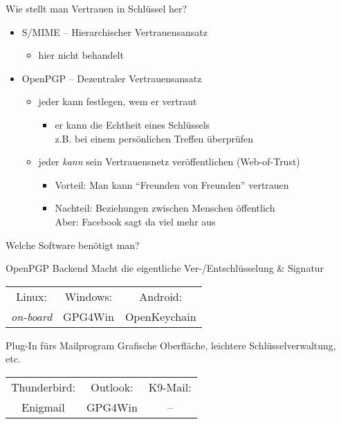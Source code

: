 \begin{frame}{Wie stellt man Vertrauen in Schlüssel her?}
  \begin{itemize}
    \item S/MIME -- Hierarchischer Vertrauensansatz
    \begin{itemize}
      \item hier nicht behandelt
    \end{itemize}
    \item OpenPGP -- Dezentraler Vertrauensansatz
    \begin{itemize}
      \item jeder kann festlegen, wem er vertraut
      \begin{itemize}
        \item er kann die Echtheit eines Schlüssels\\ z.B. bei einem persönlichen Treffen überprüfen
      \end{itemize}
      \item jeder \emph{kann} sein Vertrauensnetz veröffentlichen (Web-of-Trust)
      \begin{itemize}
        \item Vorteil: Man kann ``Freunden von Freunden'' vertrauen
        \item Nachteil: Beziehungen zwischen Menschen öffentlich\\ Aber: Facebook sagt da viel mehr aus
      \end{itemize}
    \end{itemize}
  \end{itemize}
\end{frame}

\begin{frame}{Welche Software benötigt man?}
  \begin{block}{OpenPGP Backend}
    Macht die eigentliche Ver-/Entschlüsselung \& Signatur

    \vspace{1ex}
    \begin{tabular}{ccc}
      Linux:            & Windows: & Android:     \\
      \textit{on-board} & GPG4Win  & OpenKeychain \\
    \end{tabular}
  \end{block}
  \begin{block}{Plug-In fürs Mailprogram}
    Grafische Oberfläche, leichtere Schlüsselverwaltung, etc.

    \vspace{1ex}
    \begin{tabular}{ccc}
      Thunderbird: & Outlook: & K9-Mail: \\
      Enigmail     & GPG4Win  & --       \\
    \end{tabular}
  \end{block}
\end{frame}

